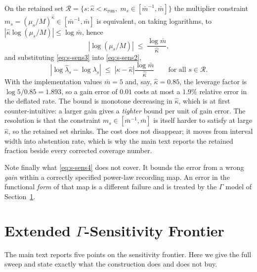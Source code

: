 \documentclass[journal,10pt,onecolumn]{IEEEtran}
\begin{document}
On the retained set
$\mathcal{R} = \{s : \hat\kappa < \kappa_{\mathrm{run}},\;
m_s \in [\bar{m}^{-1}, \bar{m}]\}$ the multiplier constraint
$m_s = (\mu_s/M)^{\hat\kappa} \in [\bar{m}^{-1},\bar{m}]$ is equivalent, on taking
logarithms, to $|\hat\kappa \log(\mu_s/M)| \le \log\bar{m}$, hence
\begin{equation}
\label{eq:s-sens3}
\left|\log(\mu_s/M)\right| \;\le\; \frac{\log\bar{m}}{\hat\kappa},
\end{equation}
and substituting \eqref{eq:s-sens3} into \eqref{eq:s-sens2},
\begin{equation}
\label{eq:s-sens4}
\left|\log\hat{\lambda}_s - \log\lambda_s\right|
\;\le\; \left|\kappa - \hat\kappa\right| \frac{\log\bar{m}}{\hat\kappa}
\qquad \text{for all } s \in \mathcal{R}.
\end{equation}
With the implementation values $\bar{m} = 5$ and, say, $\hat\kappa = 0.85$, the
leverage factor is $\log 5 / 0.85 = 1.893$, so a gain error of $0.01$ costs at
most a $1.9\%$ relative error in the deflated rate. The bound is monotone
decreasing in $\hat\kappa$, which is at first counter-intuitive: a larger gain
gives a \emph{tighter} bound per unit of gain error. The resolution is that the
constraint $m_s \in [\bar{m}^{-1},\bar{m}]$ is itself harder to satisfy at large
$\hat\kappa$, so the retained set shrinks. The cost does not disappear; it moves
from interval width into abstention rate, which is why the main text reports the
retained fraction beside every corrected coverage number.

Note finally what \eqref{eq:s-sens4} does not cover. It bounds the error from a
wrong \emph{gain} within a correctly specified power-law recording map. An error
in the functional \emph{form} of that map is a different failure and is treated by
the $\Gamma$ model of Section~\ref{sec:s2}.

\section{Extended $\Gamma$-Sensitivity Frontier}
\label{sec:s2}

The main text reports five points on the sensitivity frontier. Here we give the
full sweep and state exactly what the construction does and does not buy.
\end{document}
